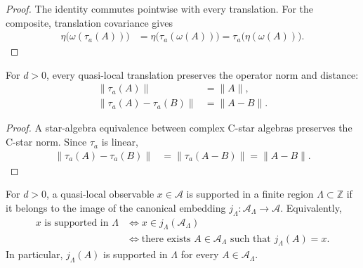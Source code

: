 \begin{proof}\leanok
    The identity commutes pointwise with every translation.  For the composite,
    translation covariance gives
    \begin{align}
        \eta\bigl(\omega(\tau_a(A))\bigr)
         & =\eta\bigl(\tau_a(\omega(A))\bigr)
        =\tau_a\bigl(\eta(\omega(A))\bigr).
    \end{align}
\end{proof}

\begin{lemma}
    \label{lem:qca_quasi_local_translation_isometry}
    \leanok
    For $d>0$, every quasi-local translation preserves the operator norm and
    distance:
    \begin{align}
        \lVert\tau_a(A)\rVert           & =\lVert A\rVert,   \\
        \lVert\tau_a(A)-\tau_a(B)\rVert & =\lVert A-B\rVert.
    \end{align}
\end{lemma}

\begin{proof}\leanok
    A star-algebra equivalence between complex C-star algebras preserves the
    C-star norm.  Since $\tau_a$ is linear,
    \begin{align}
        \lVert\tau_a(A)-\tau_a(B)\rVert
         & =\lVert\tau_a(A-B)\rVert
        =\lVert A-B\rVert.
    \end{align}
\end{proof}

\begin{definition}
    \label{def:qca_quasi_local_supported_in}
    \leanok
    For $d>0$, a quasi-local observable $x\in\mathcal A$ is supported in a
    finite region $\Lambda\subset\mathbb Z$ if it belongs to the image of the
    canonical embedding $j_\Lambda\colon\mathcal A_\Lambda\to\mathcal A$.
    Equivalently,
    \begin{align}
        x\text{ is supported in }\Lambda
         & \iff x\in j_\Lambda(\mathcal A_\Lambda)         \\
         & \iff \text{there exists }A\in\mathcal A_\Lambda
        \text{ such that }j_\Lambda(A)=x.
    \end{align}
    In particular, $j_\Lambda(A)$ is supported in $\Lambda$ for every
    $A\in\mathcal A_\Lambda$.
\end{definition}

